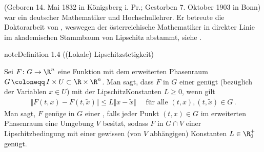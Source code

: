 \documentclass[letterpaper,10pt,german]{jupyterBook}
\begin{document}
\begin{sphinxShadowBox}

\sphinxAtStartPar
{} (Geboren 14. Mai 1832 in Königsberg i. Pr.; Gestorben 7. Oktober 1903 in Bonn) war ein deutscher Mathematiker und Hochschullehrer. Er betreute die Doktorarbeit von , weswegen der österreichische Mathematiker  in direkter Linie im akademischen Stammbaum von Lipschitz abstammt, siehe .
\end{sphinxShadowBox}
\label{ode/repetition:definition-8}
\begin{sphinxadmonition}{note}{Definition 1.4 ((Lokale) Lipschitzstetigkeit)}



\sphinxAtStartPar
Sei \(F \colon G \to \R^n\) eine Funktion mit dem erweiterten Phasenraum \(G \, \coloneqq \, I \times U \subset \R\times\R^n\).
Man sagt, dass \(F\) in \(G\) einer  genügt (bezüglich der Variablen \(x \in U\)) mit der Lipschitz\sphinxhyphen{}Konstanten \(L\geq0\), wenn gilt
\begin{equation*}
\begin{split}\Vert F(t,x) - F(t,\widetilde{x}) \Vert \leq L \Vert x-\widetilde{x}\Vert\quad\text{ für alle }(t,x), (t,\widetilde{x})\in G\,.\end{split}
\end{equation*}
\sphinxAtStartPar
Man sagt, \(F\) genüge in \(G\) einer , falls jeder Punkt \((t,x)\in G\) im erweiterten Phasenraum eine Umgebung \(V\) besitzt, sodass \(F\) in \(G\cap V\) einer Lipschitzbedingung mit einer gewissen (von \(V\) abhängigen) Konstanten \(L\in\R_0^+\) genügt.
\end{sphinxadmonition}
\end{document}
